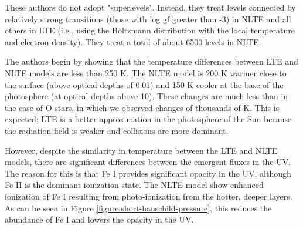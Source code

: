 These authors do not adopt "superlevels". Instead, they treat levels connected by relatively strong transitions (those with log gf greater than -3) in NLTE and all others in LTE (i.e., using the Boltzmann distribution with the local temperature and electron density). They treat a total of about 6500 levels in NLTE.

The authors begin by showing that the temperature differences between LTE and NLTE models are less than 250 K. The NLTE model is 200 K warmer close to the surface (above optical depths of 0.01) and 150 K cooler at the base of the photosphere (at optical depths above 10). These changes are much less than in the case of O stars, in which we observed changes of thousands of K. This is expected; LTE is a better approximation in the photosphere of the Sun because the radiation field is weaker and collisions are more dominant.

However, despite the similarity in temperature between the LTE and NLTE models, there are significant differences between the emergent fluxes in the UV. The reason for this is that Fe I provides significant opacity in the UV, although Fe II is the dominant ionization state. The NLTE model show enhanced ionization of Fe I resulting from photo-ionization from the hotter, deeper layers. As can be seen in Figure \ref{figure:short-hauschild-pressure}, this reduces the abundance of Fe I and lowers the opacity in the UV. 

